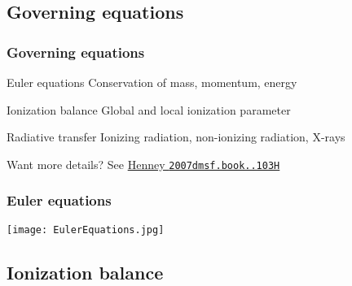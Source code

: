 \documentclass[presentation, draft]{beamer}
\begin{document}
\subsection{Governing equations}
\begin{frame}
  \frametitle{Governing equations}
  \begin{block}{Euler equations}
    Conservation of mass, \alert{momentum}, energy
  \end{block}
  \begin{block}{Ionization balance}
    Global and local ionization parameter
  \end{block}
  \begin{block}{Radiative transfer}
    \alert{Ionizing radiation}, non-ionizing radiation, X-rays
  \end{block}
  \begin{block}{Want more details?}
    See \href{http://adsabs.harvard.edu/abs/2007dmsf.book..103H}{Henney \texttt{2007dmsf.book..103H}}
  \end{block}
\end{frame}



\begin{frame}
  \frametitle{Euler equations}
  \begin{centering}
    \texttt{[image: EulerEquations.jpg]}\par
  \note{
    \[
    \frac{d}{dt} ( \rho \VEC{u} ) + \VEC{\grad} ( P + \rho u^2 ) = \rho \VEC{a} 
    \]
  }
  \end{centering}
\end{frame}

\subsection{Ionization balance}
\end{document}
